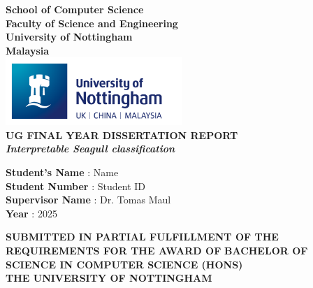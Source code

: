 \documentclass[a4paper,12pt]{article}
\begin{document}
\begin{titlepage}
    \begin{center}

        \textbf{\LARGE{School of Computer Science}}\\[0.5em]
        \textbf{\Large{Faculty of Science and Engineering}}\\[0.5em]
        \textbf{\Large{University of Nottingham}}\\[0.5em]
        \textbf{\Large{Malaysia}}\\[5em]

        \includegraphics[width=0.5\textwidth]{images/nottingham_logo.png}\\[3em]

        \textbf{\Large{UG FINAL YEAR DISSERTATION REPORT}}\\[6em]
        \textbf{\large{\textit{Interpretable Seagull classification}}}\\[6em]

    \end{center}

    \begin{center}
        \begin{minipage}{0.6\textwidth}  %
            \raggedright
            \textbf{Student's Name} \hspace{1.5cm}: Name\\[1em]
            \textbf{Student Number} \hspace{1.4cm}: Student ID\\[1em]
            \textbf{Supervisor Name} \hspace{1.2cm}: Dr. Tomas Maul\\[1em]
            \textbf{Year} \hspace{3.8cm}: 2025\\[4em]
        \end{minipage}
    \end{center}

    \vfill

    \begin{center}
        \begin{minipage}{\textwidth}
            \centering
            {\fontsize{12}{10}\selectfont\textbf{SUBMITTED IN PARTIAL FULFILLMENT OF THE REQUIREMENTS FOR THE AWARD OF}}
            {\fontsize{12}{10}\selectfont\textbf{BACHELOR OF SCIENCE IN COMPUTER SCIENCE (HONS)}}\\
            {\fontsize{12}{10}\selectfont\textbf{THE UNIVERSITY OF NOTTINGHAM}}
        \end{minipage}
    \end{center}
\end{titlepage}
\end{document}
